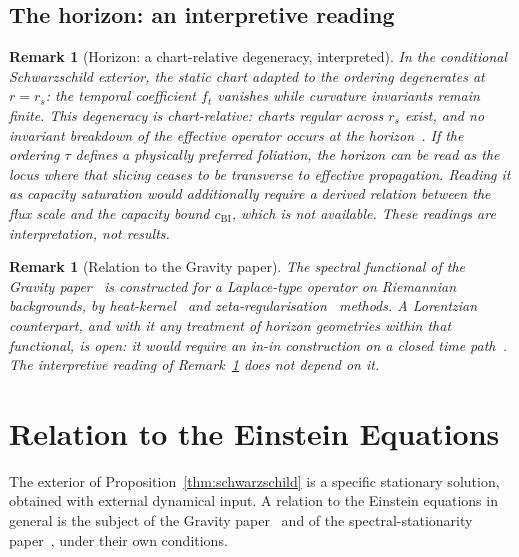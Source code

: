 \documentclass[11pt,a4paper]{article}
\newtheorem{remark}[theorem]{Remark}
\begin{document}
  \subsection{The horizon: an interpretive reading}
  \label{sec:horizon}

  \begin{remark}[Horizon: a chart-relative degeneracy, interpreted]
    \label{rem:horizon}
    In the conditional Schwarzschild exterior, the static chart adapted to the ordering degenerates at $r = r_s$: the
    temporal coefficient $f_t$ vanishes while curvature invariants remain finite.
    This degeneracy is chart-relative: charts regular across $r_s$ exist, and no invariant breakdown of the effective
    operator occurs at the horizon~\cite{Beau2026c}.
    If the ordering $\tau$ defines a physically preferred foliation, the horizon can be read as the locus where that
    slicing ceases to be transverse to effective propagation.
    Reading it as capacity saturation would additionally require a derived relation between the flux scale and the
    capacity bound $c_{\mathrm{BI}}$, which is not available.
    These readings are interpretation, not results.
  \end{remark}

  \begin{remark}[Relation to the Gravity paper]
    \label{rem:gravity-horizon}
    The spectral functional of the Gravity paper~\cite{Beau2026h} is constructed for a Laplace-type operator on
    Riemannian backgrounds, by heat-kernel~\cite{Vassilevich2003} and zeta-regularisation~\cite{Hawking1977} methods.
    A Lorentzian counterpart, and with it any treatment of horizon geometries within that functional, is open: it would
    require an in-in construction on a closed time path~\cite{Schwinger1961,Beau2026i}.
    The interpretive reading of Remark~\ref{rem:horizon} does not depend on it.
  \end{remark}

  \clearpage

  \section{Relation to the Einstein Equations}
  \label{sec:einstein}

  The exterior of Proposition~\ref{thm:schwarzschild} is a specific stationary solution, obtained with external
  dynamical input.
  A relation to the Einstein equations in general is the subject of the Gravity paper~\cite{Beau2026h} and of the
  spectral-stationarity paper~\cite{Beau2026Thermodynamics}, under their own conditions.
\end{document}
